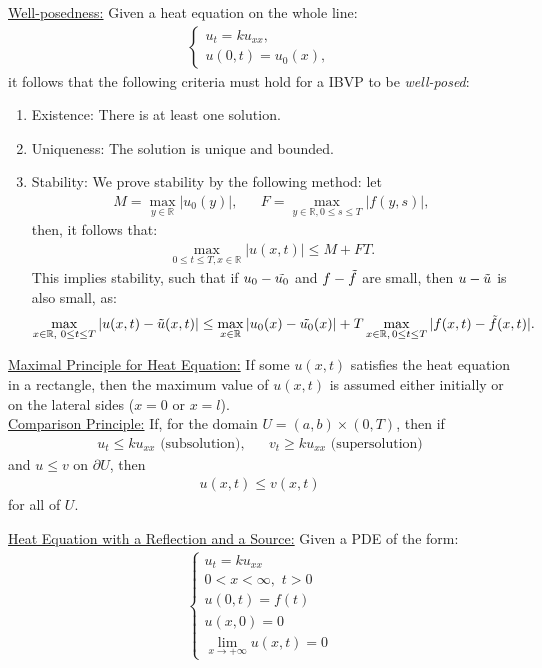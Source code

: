\documentclass{article}
\newcommand{\sheader}[1]{\underline{#1:}}
\newcommand{\gap}{\medskip\\}
\begin{document}
\sheader{Well-posedness} Given a heat equation on the whole line:
\begin{align*}
    \begin{cases}
        u_t = ku_{xx},\\
        u(0, t) = u_0(x),
    \end{cases}
\end{align*}
it follows that the following criteria must hold for a IBVP to be \textit{well-posed}:
\begin{enumerate}
    \item Existence: There is at least one solution.
    \item Uniqueness: The solution is unique and bounded.
    \item Stability: We prove stability by the following method: let
    \begin{align*}
        M = \max_{y \in \mathbb{R}} |u_0(y)|, && F = \max_{y \in \mathbb{R}, 0 \leq s \leq T} |f(y, s)|,
    \end{align*}
    then, it follows that:
    \begin{align*}
        \max_{0 \leq t \leq T, x \in \mathbb{R}}|u(x, t)| \leq M + FT.
    \end{align*}
    This implies stability, such that if $u_0 - \Tilde{u_0}$ and $f - \Tilde{f}$ are small, then $u-\Tilde{u}$ is also small, as:
    \begin{align*}
        \max_{x \in \mathbb{R}, \,\, 0 \leq t \leq T} |u(x, t) - \Tilde u(x, t) | \leq \max_{x \in \mathbb{R}} |u_0(x) - \Tilde{u_0}(x)| 
        + T \max_{x\in \mathbb{R}, \, 0 \leq t \leq T}|f(x, t) - \Tilde{f}(x, t) |.
    \end{align*}
\end{enumerate}

\sheader{Maximal Principle for Heat Equation} If some $u(x,t)$ satisfies the heat 
equation in a rectangle, then the maximum value of $u(x, t)$ is assumed either 
initially or on the lateral sides ($x=0$ or $x=l$).
\gap
\sheader{Comparison Principle} If, for the domain $U = (a, b) \times (0, T)$,
then if 
\begin{align*}
   u_t \leq ku_{xx} \textrm{ (subsolution)}, && v_t \geq ku_{xx} \textrm{ (supersolution)}
\end{align*}
and $u \leq v$ on $\partial U$, then
\begin{align*}
    u(x,t) \leq v(x, t)
\end{align*}
for all of $U$.
\pagebreak

\sheader{Heat Equation with a Reflection and a Source} Given a PDE of the form:
\begin{align*}
    \begin{cases}
        u_t = ku_{xx}\\
        0<x<\infty,\,\, t> 0\\
        u(0, t) = f(t)\\
        u(x, 0) = 0\\
        \lim_{x \to + \infty} u(x, t) = 0
    \end{cases}
\end{align*}
\end{document}
